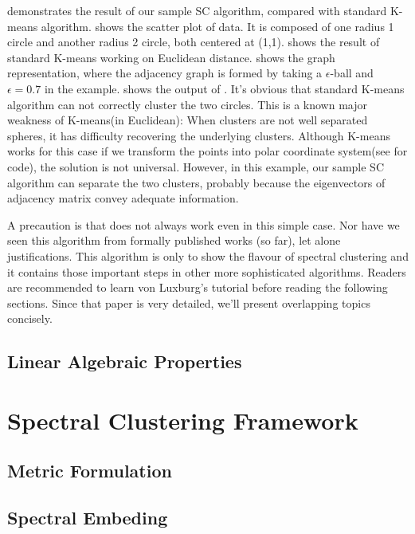 \rfig{\ref{fig:ssc_demo}} demonstrates the result of our sample SC algorithm, 
compared with standard K-means algorithm. 
\rfig{\ref{fig:ssc_data}} shows the scatter plot of data. 
It is composed of one radius 1 circle and another radius 2 circle, 
both centered at (1,1). 
\rfig{\ref{fig:ssc_kmeans}} shows the result of standard K-means
working on Euclidean distance. 
\rfig{\ref{fig:ssc_adj}} shows the graph representation, where 
the adjacency graph is formed by taking a $\epsilon$-ball and 
$\epsilon=0.7$ in the example. 
\rfig{\ref{fig:ssc_sc}} shows the output of \ralg{\ref{alg:sc_sample}}. 
It's obvious that standard K-means algorithm can not correctly cluster 
the two circles. This is a known major weakness of K-means(in Euclidean): 
When clusters are not well separated spheres, it has difficulty recovering 
the underlying clusters. Although K-means works for this case 
if we transform the points 
into polar coordinate system(see \cite{hu2012-spectral2hop} for code), 
the solution is not universal. However, in this example, our sample SC 
algorithm can separate the two clusters, probably because the eigenvectors
of adjacency matrix convey adequate information. 

A precaution is that \ralg{\ref{alg:sc_sample}} does not always work even 
in this simple case. Nor have we seen this algorithm from formally published works
(so far), let alone justifications. This algorithm is only to show the flavour 
of spectral clustering and it contains those important steps in other
more sophisticated algorithms. Readers are recommended to learn 
von Luxburg's tutorial\cite{von2007tutorial} before reading the following sections. 
Since that paper is very detailed, we'll present overlapping topics 
concisely. 


\subsection{Linear Algebraic Properties}

\section{Spectral Clustering Framework}

\subsection{Metric Formulation}

\subsection{Spectral Embeding}

